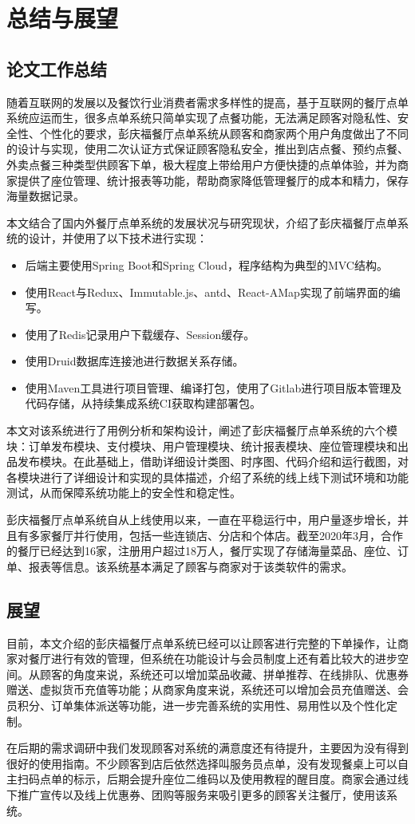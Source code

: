 \chapter{总结与展望}
\section{论文工作总结}
随着互联网的发展以及餐饮行业消费者需求多样性的提高，基于互联网的餐厅点单系统应运而生，很多点单系统只简单实现了点餐功能，无法满足顾客对隐私性、安全性、个性化的要求，彭庆福餐厅点单系统从顾客和商家两个用户角度做出了不同的设计与实现，使用二次认证方式保证顾客隐私安全，推出到店点餐、预约点餐、外卖点餐三种类型供顾客下单，极大程度上带给用户方便快捷的点单体验，并为商家提供了座位管理、统计报表等功能，帮助商家降低管理餐厅的成本和精力，保存海量数据记录。

本文结合了国内外餐厅点单系统的发展状况与研究现状，介绍了彭庆福餐厅点单系统的设计，并使用了以下技术进行实现：
\begin{itemize}
    \item 后端主要使用Spring Boot和Spring Cloud，程序结构为典型的MVC结构。
    \item 使用React与Redux、Immutable.js、antd、React-AMap实现了前端界面的编写。
    \item 使用了Redis记录用户下载缓存、Session缓存。
    \item 使用Druid数据库连接池进行数据关系存储。
    \item 使用Maven工具进行项目管理、编译打包，使用了Gitlab进行项目版本管理及代码存储，从持续集成系统CI获取构建部署包。
\end{itemize}

本文对该系统进行了用例分析和架构设计，阐述了彭庆福餐厅点单系统的六个模块：订单发布模块、支付模块、用户管理模块、统计报表模块、座位管理模块和出品发布模块。在此基础上，借助详细设计类图、时序图、代码介绍和运行截图，对各模块进行了详细设计和实现的具体描述，介绍了系统的线上线下测试环境和功能测试，从而保障系统功能上的安全性和稳定性。

彭庆福餐厅点单系统自从上线使用以来，一直在平稳运行中，用户量逐步增长，并且有多家餐厅并行使用，包括一些连锁店、分店和个体店。截至2020年3月，合作的餐厅已经达到16家，注册用户超过18万人，餐厅实现了存储海量菜品、座位、订单、报表等信息。该系统基本满足了顾客与商家对于该类软件的需求。\\

\section{展望}
目前，本文介绍的彭庆福餐厅点单系统已经可以让顾客进行完整的下单操作，让商家对餐厅进行有效的管理，但系统在功能设计与会员制度上还有着比较大的进步空间。从顾客的角度来说，系统还可以增加菜品收藏、拼单推荐、在线排队、优惠券赠送、虚拟货币充值等功能；从商家角度来说，系统还可以增加会员充值赠送、会员积分、订单集体派送等功能，进一步完善系统的实用性、易用性以及个性化定制。

在后期的需求调研中我们发现顾客对系统的满意度还有待提升，主要因为没有得到很好的使用指南。不少顾客到店后依然选择叫服务员点单，没有发现餐桌上可以自主扫码点单的标示，后期会提升座位二维码以及使用教程的醒目度。商家会通过线下推广宣传以及线上优惠券、团购等服务来吸引更多的顾客关注餐厅，使用该系统。